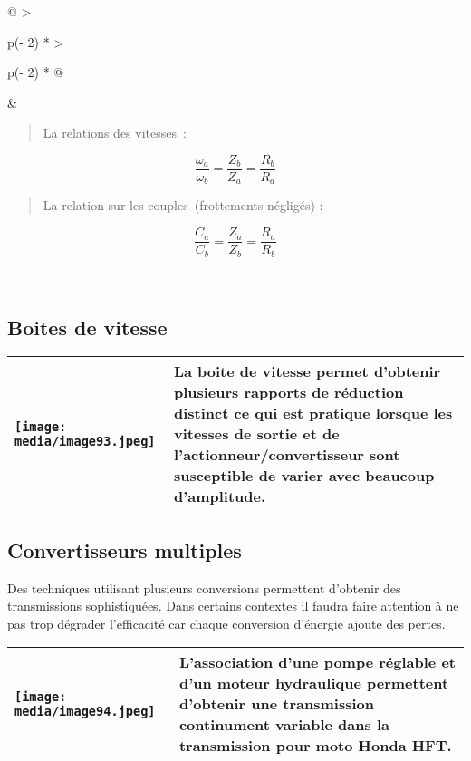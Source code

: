 \documentclass[
]{article}
\begin{document}
\begin{longtable}[]{@{}
  >{\raggedright\arraybackslash}p{(\columnwidth - 2\tabcolsep) * }
  >{\raggedright\arraybackslash}p{(\columnwidth - 2\tabcolsep) * }@{}}
\toprule
\endhead
& \begin{minipage}[t]{\linewidth}\raggedright
\begin{quote}
La relations des vitesses~:
\end{quote}

\[\boxed{\frac{\omega_{a}}{\omega_{b}} = \frac{Z_{b}}{Z_{a}} = \frac{R_{b}}{R_{a}}}\]

\begin{quote}
La relation sur les couples~\(
\)(frottements négligés) :
\end{quote}

\[\boxed{\frac{C_{a}}{C_{b}} = \frac{Z_{a}}{Z_{b}} = \frac{R_{a}}{R_{b}}}\]
\end{minipage} \\
\bottomrule
\end{longtable}

\hypertarget{boites-de-vitesse}{%
\subsection{Boites de vitesse}\label{boites-de-vitesse}}

\begin{longtable}[]{@{}ll@{}}
\toprule
\endhead
\texttt{[image: media/image93.jpeg]} & La
boite de vitesse permet d'obtenir plusieurs rapports de réduction
distinct ce qui est pratique lorsque les vitesses de sortie et de
l'actionneur/convertisseur sont susceptible de varier avec beaucoup
d'amplitude. \\
\bottomrule
\end{longtable}

\hypertarget{convertisseurs-multiples}{%
\subsection{Convertisseurs multiples}\label{convertisseurs-multiples}}

Des techniques utilisant plusieurs conversions permettent d'obtenir des
transmissions sophistiquées. Dans certains contextes il faudra faire
attention à ne pas trop dégrader l'efficacité car chaque conversion
d'énergie ajoute des pertes.

\begin{longtable}[]{@{}ll@{}}
\toprule
\endhead
\texttt{[image: media/image94.jpeg]} &
L'association d'une pompe réglable et d'un moteur hydraulique permettent
d'obtenir une transmission continument variable dans la transmission
pour moto Honda HFT. \\
\bottomrule
\end{longtable}
\end{document}
